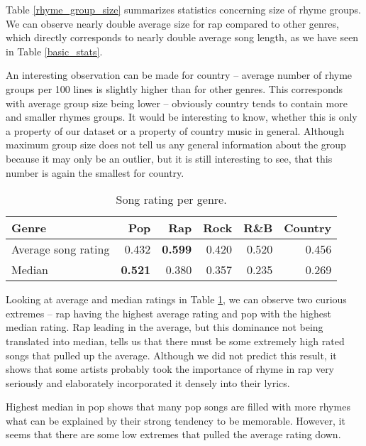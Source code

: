 Table \ref{rhyme_group_size} summarizes statistics concerning size of rhyme groups. We can observe nearly double average size for rap compared to other genres, which directly corresponds to nearly double average song length, as we have seen in Table \ref{basic_stats}. 

An interesting observation can be made for country -- average number of rhyme groups per 100 lines is slightly higher than for other genres. This corresponds with average group size being lower -- obviously country tends to contain more and smaller rhymes groups. It would be interesting to know, whether this is only a property of our dataset or a property of country music in general. Although maximum group size does not tell us any general information about the group because it may only be an outlier, but it is still interesting to see, that this number is again the smallest for country.

\begin{table}[h!]
	\centering
	\begin{tabular}{l | r r r r r} 	
		Genre & 			Pop & 		Rap & 		Rock & 		R\&B & 		Country\\ 
		\midrule
		Average song rating& 0.432 & \textbf{0.599} &0.420 &0.520 &0.456  \\
		Median & \textbf{0.521} & 0.380 &0.357 &0.235 & 0.269\\
	\end{tabular}
	\caption{Song rating per genre.} 
	\label{song_rating_stats}
\end{table}

Looking at average and median ratings in Table \ref{song_rating_stats}, we can observe two curious extremes -- rap having the highest average rating and pop with the highest median rating. Rap leading in the average, but this dominance not being translated into median, tells us that there must be some extremely high rated songs that pulled up the average. Although we did not predict this result, it shows that some artists probably took the importance of rhyme in rap very seriously and elaborately incorporated it densely into their lyrics.

Highest median in pop shows that many pop songs are filled with more rhymes what can be explained by their strong tendency to be memorable. However, it seems that there are some low extremes that pulled the average rating down.